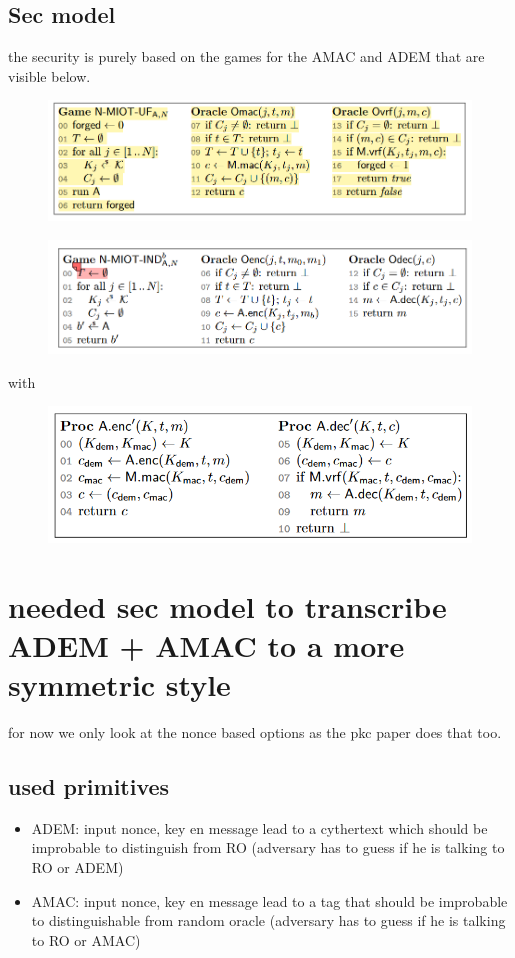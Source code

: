 \documentclass{article}
\begin{document}
\subsection{Sec model}
the security is purely based on the games for the AMAC and ADEM that are visible below.
\begin{figure}[H]
    \centering
    \includegraphics[scale = 0.5]{gebrabbel images/game mac.png}
\end{figure}
\begin{figure}[H]
    \centering
    \includegraphics[scale = 0.5]{gebrabbel images/game adem.png}
\end{figure}
with
\begin{figure}[H]
    \centering
    \includegraphics[scale = 0.5]{gebrabbel images/adem amac.png}
\end{figure}


\newpage
\section{needed sec model to transcribe ADEM + AMAC to a more symmetric style}
for now we only look at the nonce based options as the pkc paper does that too.
\subsection{used primitives}
\begin{itemize}
    \item ADEM: input nonce, key en message lead to a cythertext which should be improbable to distinguish from RO (adversary has to guess if he is talking to RO or ADEM)
    
    \item AMAC: input nonce, key en message lead to a tag that should be improbable to distinguishable from random oracle (adversary has to guess if he is talking to RO or AMAC)
\end{itemize}
\end{document}
